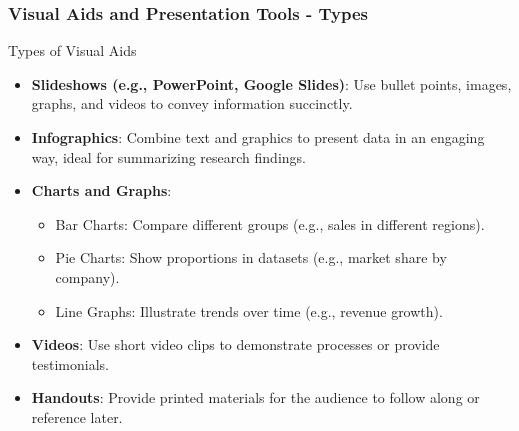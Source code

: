 \documentclass{beamer}
\begin{document}
\begin{frame}[fragile]
    \frametitle{Visual Aids and Presentation Tools - Types}
    \begin{block}{Types of Visual Aids}
        \begin{itemize}
            \item \textbf{Slideshows (e.g., PowerPoint, Google Slides)}: Use bullet points, images, graphs, and videos to convey information succinctly.
            \item \textbf{Infographics}: Combine text and graphics to present data in an engaging way, ideal for summarizing research findings.
            \item \textbf{Charts and Graphs}:
                \begin{itemize}
                    \item Bar Charts: Compare different groups (e.g., sales in different regions).
                    \item Pie Charts: Show proportions in datasets (e.g., market share by company).
                    \item Line Graphs: Illustrate trends over time (e.g., revenue growth).
                \end{itemize}
            \item \textbf{Videos}: Use short video clips to demonstrate processes or provide testimonials.
            \item \textbf{Handouts}: Provide printed materials for the audience to follow along or reference later.
        \end{itemize}
    \end{block}
\end{frame}
\end{document}
